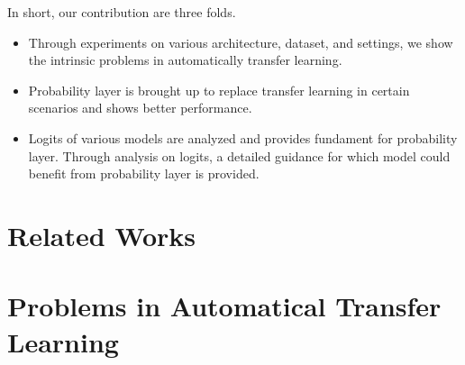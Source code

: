 \documentclass{article}
\begin{document}
In short, our contribution are three folds.
\begin{itemize}
    \item Through experiments on various architecture, dataset, and settings, we show the intrinsic problems in automatically transfer learning. 
    \item Probability layer is brought up to replace transfer learning in certain scenarios and shows better performance. 
    \item Logits of various models are analyzed and provides fundament for probability layer. Through analysis on logits, a detailed guidance for which model could benefit from probability layer is provided. 
\end{itemize}

\section{Related Works}



\section{Problems in Automatical Transfer Learning}
\end{document}

